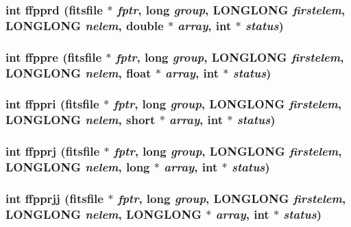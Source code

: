 \subsubsection{\setlength{\rightskip}{0pt plus 5cm}int ffpprd (\bf{fitsfile} $\ast$ {\em fptr}, long {\em group}, \bf{LONGLONG} {\em firstelem}, \bf{LONGLONG} {\em nelem}, double $\ast$ {\em array}, int $\ast$ {\em status})}\label{fitsio_8h_bcb9e32598b5c68125623cc6ad18adf5}


\subsubsection{\setlength{\rightskip}{0pt plus 5cm}int ffppre (\bf{fitsfile} $\ast$ {\em fptr}, long {\em group}, \bf{LONGLONG} {\em firstelem}, \bf{LONGLONG} {\em nelem}, float $\ast$ {\em array}, int $\ast$ {\em status})}\label{fitsio_8h_a7ad2029b3f043c3e909413184e5ce2f}


\subsubsection{\setlength{\rightskip}{0pt plus 5cm}int ffppri (\bf{fitsfile} $\ast$ {\em fptr}, long {\em group}, \bf{LONGLONG} {\em firstelem}, \bf{LONGLONG} {\em nelem}, short $\ast$ {\em array}, int $\ast$ {\em status})}\label{fitsio_8h_08d9b16056155823102497a507020ba4}


\subsubsection{\setlength{\rightskip}{0pt plus 5cm}int ffpprj (\bf{fitsfile} $\ast$ {\em fptr}, long {\em group}, \bf{LONGLONG} {\em firstelem}, \bf{LONGLONG} {\em nelem}, long $\ast$ {\em array}, int $\ast$ {\em status})}\label{fitsio_8h_3c55a012f7481ed3927bf03edd17d1fd}


\subsubsection{\setlength{\rightskip}{0pt plus 5cm}int ffpprjj (\bf{fitsfile} $\ast$ {\em fptr}, long {\em group}, \bf{LONGLONG} {\em firstelem}, \bf{LONGLONG} {\em nelem}, \bf{LONGLONG} $\ast$ {\em array}, int $\ast$ {\em status})}\label{fitsio_8h_e85ab8414b75198f2ed51e1caff54eff}


